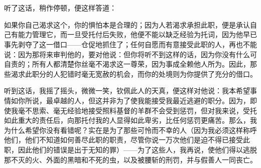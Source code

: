 

\section{}

听了这话，稍作停顿，便这样答道：\par

如果你自己渴求这个，你的惧怕本是合理的；因为人若渴求承担此职，便是承认自己有能力管理它，而一旦受托付后失败，他便不能以缺乏经验为托词，因为他早已事先剥夺了这一借口——仓促地抓住了；任何自愿而有意接受此职的人，再也不能说：因为那将来审判他的，要对他说：但你将听不到这样的话，因为你没有什么可自责的；所有人都清楚你丝毫不渴求这一尊荣，因为事成全赖他人所为。因此，那些渴求此职分的人犯错时毫无宽赦的机会，而你的处境则为你提供了充分的借口。\par

听到这话，我摇了摇头，微微一笑，钦佩此人的天真，便这样对他说：我本希望事情如你所说，最卓越的人，但这并非为了使我能接受我最近逃避的职分。因为，即使我毫不思索、毫无经验地接受照料基督的羊群不会受到惩罚，但对我来说，受托如此重大的责任后，向那托付我的人显得如此卑劣，比任何惩罚更痛苦。那么，我为什么希望你没有看错呢？实在是为了那些可怜而不幸的人（因为我必须这样称呼他们，他们不知道如何善尽此职的职责，尽管你说一万次他们是迫不得已接受此职，因此他们的错误是出于无知的罪）——为了这些人，我再说，使他们得以逃脱那不灭的火、外面的黑暗和不死的虫，以及被腰斩的刑罚，并与假善人一同丧亡。\par


